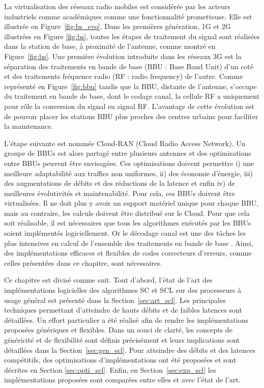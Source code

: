 La virtualisation des réseaux radio mobiles est considérée par les acteurs industriels \cite{ericsson_cloud_2015,huawei_5g:_2013,checko_cloud_2015} comme académiques \cite{wubben_benefits_2014,rost_cloud_2014} comme une fonctionnalité prometteuse. Elle est illustrée en Figure~\ref{fig:bs_evo}. Dans les premières génération, 1G et 2G illustrées en Figure \ref{fig:bs}, toutes les étapes de traitement du signal sont réalisées dans la station de base, à proximité de l'antenne, comme montré en Figure~\ref{fig:bs}. Une première évolution introduite dans les réseaux 3G est la séparation des traitements en bande de base (BBU : Base Band Unit) d'un coté et des traitements fréquence radio (RF : radio frequency) de l'autre. Comme représenté en Figure~\ref{fig:bbu} tandis que la BBU, distante de l'antenne, s'occupe du traitement en bande de base, dont le codage canal, la cellule RF a uniquement pour rôle la conversion du signal en signal RF. L'avantage de cette évolution est de pouvoir placer les stations BBU plus proches des centres urbains pour faciliter la maintenance.

L'étape suivante est nommée Cloud-RAN (Cloud Radio Access Network). Un groupe de BBUs est alors partagé entre plusieurs antennes et des optimisations entre BBUs peuvent être envisagées. Ces optimisations doivent permettre i) une meilleure adaptabilité aux traffics non uniformes, ii) des économie d'énergie, iii) des augmentations de débits et des réductions de la latence et enfin iv) de meilleures évolutivités et maintenabilité. Pour cela, ces BBUs doivent être virtualisées. Il ne doit plus y avoir un support matériel unique pour chaque BBU, mais au contraire, les calculs doivent être distribué sur le Cloud. Pour que cela soit réalisable, il est nécessaires que tous les algorithmes exécutés par les BBUs soient implémentés logiciellement. Or le décodage canal est une des tâches les plus intensives en calcul de l'ensemble des traitements en bande de base \cite{rodriguez_towards_2017,nikaein_processing_2015}. Ainsi, des implémentations efficaces et flexibles de codes correcteurs d'erreurs, comme celles présentées dans ce chapitre, sont nécessaires.

Ce chapitre est divisé comme suit. Tout d'abord, l'état de l'art des implémentations logicielles des algorithmes SC et SCL sur des processeurs à usage général est présenté dans la Section~\ref{sec:art_scl}. Les principales techniques permettant d'atteindre de hauts débits et de faibles latences sont détaillées. Un effort particulier a été réalisé afin de rendre les implémentations proposées génériques et flexibles. Dans un souci de clarté, les concepts de généricité et de flexibilité sont définis précisément et leurs implications sont détaillées dans la Section~\ref{sec:gen_scl}. Pour atteindre des débits et des latences compétitifs, des optimisations d'implémentations ont été proposées et sont décrites en Section \ref{sec:opti_scl}. Enfin, en Section~\ref{sec:exp_scl} les implémentations proposées sont comparées entre elles et avec l'état de l'art.

